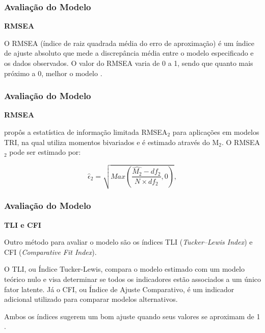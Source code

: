 \documentclass{beamer}
\begin{document}
\begin{frame}
	
	\frametitle{Avaliação do Modelo}
	
	\begin{center}
		\textbf{RMSEA} 
		\hfill
	\end{center}
	
	O RMSEA (índice de raiz quadrada média do erro de aproximação) é um índice de ajuste absoluto que mede a discrepância média entre o modelo especificado e os dados observados. O valor do RMSEA varia de 0 a 1, sendo que quanto mais próximo a 0, melhor o modelo \cite{kline2016principles}.
	
\end{frame}	

\begin{frame}
	
	\frametitle{Avaliação do Modelo}
	
	\begin{center}
		\textbf{RMSEA} 
		\hfill
	\end{center}
		 \cite{maydeu2014assessing} propôs a estatística de informação limitada RMSEA$_{2}$ para aplicações em modelos TRI, na qual utiliza momentos bivariados e é estimado através do M$_2$. O RMSEA$_2$ pode ser estimado por:
		
		\[
		\hat{\epsilon}_2 = \sqrt{Max\left(\frac{\hat{M_{2}} - df_{2}}
			{N \times df_{2}}, 0 \right) } ,
		\]
	
\end{frame}	

\begin{frame}
	
	\frametitle{Avaliação do Modelo}
	
	\begin{center}
		\textbf{TLI e CFI} 
		\hfill
	\end{center}
	
	Outro método para avaliar o modelo são os índices TLI (\textit{Tucker–Lewis Index}) e CFI (\textit{Comparative Fit Index}).
	
	 O TLI, ou Índice Tucker-Lewis, compara o modelo estimado com um modelo teórico nulo e visa determinar se todos os indicadores estão associados a um único fator latente.
	 Já o CFI, ou Índice de Ajuste Comparativo, é um indicador adicional utilizado para comparar modelos alternativos. 
	 
	 Ambos os índices sugerem um bom ajuste quando seus valores se aproximam de 1 \cite{hair2009multivariada}.
\end{frame}
\end{document}
